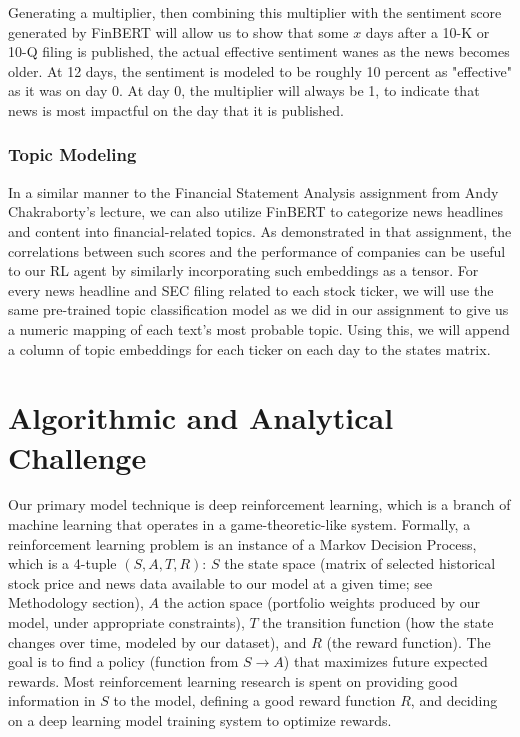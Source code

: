 
Generating a multiplier, then combining this multiplier with the sentiment score generated by FinBERT will allow us to show that some $x$ days after a 10-K or 10-Q filing is published, the actual effective sentiment wanes as the news becomes older. At 12 days, the sentiment is modeled to be roughly 10 percent as "effective" as it was on day 0. At day 0, the multiplier will always be 1, to indicate that news is most impactful on the day that it is published.

\subsubsection{Topic Modeling}

In a similar manner to the Financial Statement Analysis assignment from 
Andy Chakraborty’s lecture, we can also utilize FinBERT to categorize news 
headlines and content into financial-related topics. As demonstrated in that 
assignment, the correlations between such scores and the performance of 
companies can be useful to our RL agent by similarly incorporating such 
embeddings as a tensor. For every news headline and SEC filing related to 
each stock ticker, we will use the same pre-trained topic classification model 
as we did in our assignment to give us a numeric mapping of each text’s most 
probable topic. Using this, we will append a column of topic embeddings for 
each ticker on each day to the states matrix.

\section{Algorithmic and Analytical Challenge}

Our primary model technique is deep reinforcement learning, which is a 
branch of machine learning that operates in a game-theoretic-like system. 
Formally, a reinforcement learning problem is an instance of a Markov 
Decision Process, which is a 4-tuple $(S, A, T, R)$: $S$ the state space 
(matrix of selected historical stock price and news data available to 
our model at a given time; see Methodology section), $A$ the action space 
(portfolio weights produced by our model, under appropriate constraints), 
$T$ the transition function (how the state changes over time, modeled by our dataset), 
and $R$ (the reward function). The goal is to find a policy (function from $S \to A$) 
that maximizes future expected rewards. Most reinforcement learning research is 
spent on providing good information in $S$ to the model, defining a good reward 
function $R$, and deciding on a deep learning model training system to optimize rewards.

